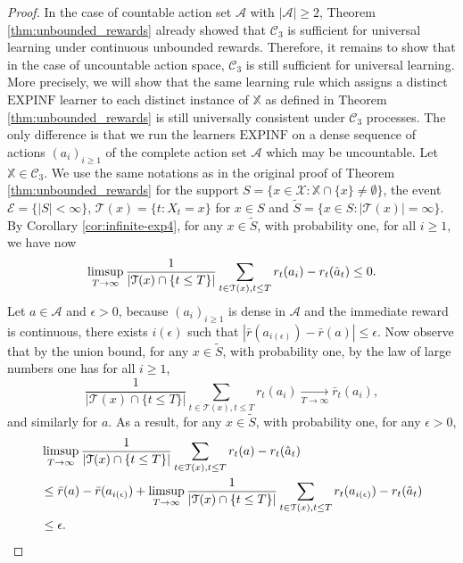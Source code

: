 \documentclass[aos]{imsart}
\theoremstyle{plain}
\theoremstyle{remark}
\newcommand{\Acal}{\mathcal{A}}
\newcommand{\Ccal}{\mathcal{C}}
\newcommand{\Ecal}{\mathcal{E}}
\newcommand{\Tcal}{\mathcal{T}}
\newcommand{\Xcal}{\mathcal{X}}
\newcommand{\Xbb}{\mathbb{X}}
\newcommand{\1}{\mathbbm{1}}%
\newcommand{\EXPINF}{\mathrm{EXPINF}}
\renewcommand{\limsup}{\mathop{\rm limsup}}
\begin{document}
\begin{proof}
In the case of countable action set $\Acal$ with $|\Acal|\geq 2$, Theorem \ref{thm:unbounded_rewards} already showed that $\Ccal_3$ is sufficient for universal learning under continuous unbounded rewards. Therefore, it remains to show that in the case of uncountable action space, $\Ccal_3$ is still sufficient for universal learning. More precisely, we will show that the same learning rule which assigns a distinct $\EXPINF$ learner to each distinct instance of $\Xbb$ as defined in Theorem \ref{thm:unbounded_rewards} is still universally consistent under $\Ccal_3$ processes. The only difference is that we run the learners $\EXPINF$ on a dense sequence of actions $(a_i)_{i\geq 1}$ of the complete action set $\Acal$ which may be uncountable. Let $\Xbb\in\Ccal_3$. We use the same notations as in the original proof of Theorem \ref{thm:unbounded_rewards} for the support $S=\{x\in\Xcal:\Xbb\cap\{x\}\neq\emptyset\}$, the event $\Ecal = \{|S|<\infty\}$, $\Tcal(x) = \{t:X_t=x\}$ for $x\in S$ and $\tilde S = \{x\in S:|\Tcal(x)|=\infty\}$. By Corollary \ref{cor:infinite-exp4}, for any $x\in\tilde S$, with probability one, for all $i\geq 1$, we have now
\begin{equation*}
    \limsup_{T\to\infty}\frac{1}{|\Tcal(x)\cap\{t\leq T\}|}\sum_{t\in\Tcal(x),t\leq T} r_t(a_i) - r_t(\hat a_t) \leq 0.
\end{equation*}
Let $a\in\Acal$ and $\epsilon>0$, because $(a_i)_{i\geq 1}$ is dense in $\Acal$ and the immediate reward is continuous, there exists $i(\epsilon)$ such that $|\bar r(a_{i(\epsilon)}) - \bar r(a)|\leq \epsilon$. Now observe that by the union bound, for any $x\in\tilde S$, with probability one, by the law of large numbers one has for all $i\geq 1$,
\begin{equation*}
    \frac{1}{|\Tcal(x)\cap\{t\leq T\}|}\sum_{t\in\Tcal(x),t\leq T} r_t(a_i) \underset{T\to\infty}{\longrightarrow} \bar r_t(a_i),
\end{equation*}
and similarly for $a$. As a result, for any $x\in\tilde S$, with probability one, for any $\epsilon>0$,
\begin{align*}
    &\limsup_{T\to\infty}\frac{1}{|\Tcal(x)\cap\{t\leq T\}|}\sum_{t\in\Tcal(x),t\leq T} r_t(a) - r_t(\hat a_t) \\
    &\leq \bar r(a) - \bar r(a_{i(\epsilon)}) + \limsup_{T\to\infty}\frac{1}{|\Tcal(x)\cap\{t\leq T\}|}\sum_{t\in\Tcal(x),t\leq T} r_t(a_{i(\epsilon)}) - r_t(\hat a_t)\\
    &\leq \epsilon.
\end{align*}

\end{proof}
\end{document}
